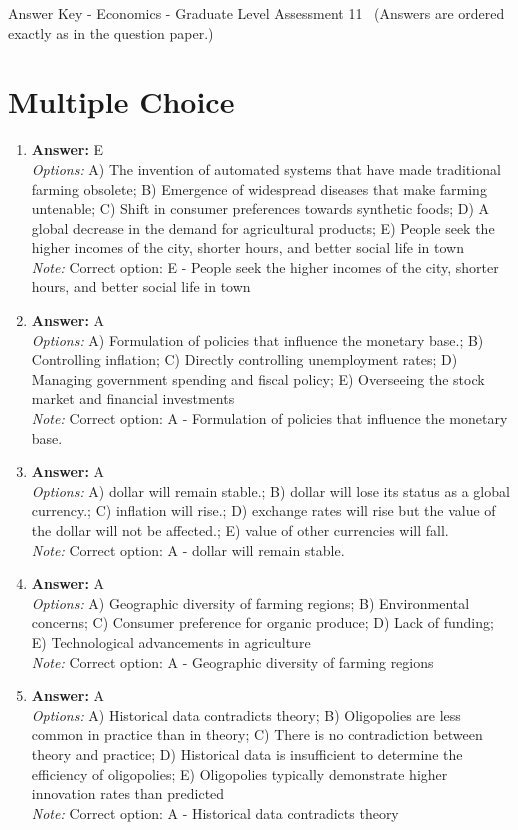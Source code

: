 \documentclass[12pt]{article}
\begin{document}
\begin{center}
Answer Key - Economics - Graduate Level Assessment 11 \
\small (Answers are ordered exactly as in the question paper.)
\end{center}

\section*{Multiple Choice}
\begin{enumerate}[label=\arabic*.]
\item \textbf{Answer:} E
\\ \textit{Options:} A) The invention of automated systems that have made traditional farming obsolete; B) Emergence of widespread diseases that make farming untenable; C) Shift in consumer preferences towards synthetic foods; D) A global decrease in the demand for agricultural products; E) People seek the higher incomes of the city, shorter hours, and better social life in town
\\ \textit{Note:} Correct option: E - People seek the higher incomes of the city, shorter hours, and better social life in town
\item \textbf{Answer:} A
\\ \textit{Options:} A) Formulation of policies that influence the monetary base.; B) Controlling inflation; C) Directly controlling unemployment rates; D) Managing government spending and fiscal policy; E) Overseeing the stock market and financial investments
\\ \textit{Note:} Correct option: A - Formulation of policies that influence the monetary base.
\item \textbf{Answer:} A
\\ \textit{Options:} A) dollar will remain stable.; B) dollar will lose its status as a global currency.; C) inflation will rise.; D) exchange rates will rise but the value of the dollar will not be affected.; E) value of other currencies will fall.
\\ \textit{Note:} Correct option: A - dollar will remain stable.
\item \textbf{Answer:} A
\\ \textit{Options:} A) Geographic diversity of farming regions; B) Environmental concerns; C) Consumer preference for organic produce; D) Lack of funding; E) Technological advancements in agriculture
\\ \textit{Note:} Correct option: A - Geographic diversity of farming regions
\item \textbf{Answer:} A
\\ \textit{Options:} A) Historical data contradicts theory; B) Oligopolies are less common in practice than in theory; C) There is no contradiction between theory and practice; D) Historical data is insufficient to determine the efficiency of oligopolies; E) Oligopolies typically demonstrate higher innovation rates than predicted
\\ \textit{Note:} Correct option: A - Historical data contradicts theory
\end{enumerate}
\end{document}
